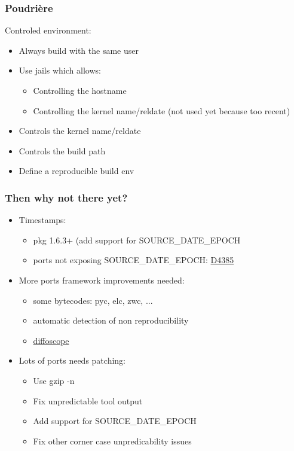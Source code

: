 \begin{frame}
	\frametitle{Poudrière}
	Controled environment:
	\begin{itemize}
		\item Always build with the same user
		\item Use jails which allows:
			\begin{itemize}
				\item Controlling the hostname
				\item Controlling the kernel name/reldate (not used yet because too recent)
			\end{itemize}
		\item Controls the kernel name/reldate
		\item Controls the build path
		\item Define a reproducible build env
	\end{itemize}
\end{frame}

\begin{frame}
	\frametitle{Then why not there yet?}
	\begin{itemize}
		\pause
		\item Timestamps:
			\begin{itemize}
				\item pkg 1.6.3+ (add support for SOURCE\_DATE\_EPOCH
				\item ports not exposing SOURCE\_DATE\_EPOCH: \href{https://reviews.freebsd.org/D4385}{D4385}
			\end{itemize}
		\pause
		\item More ports framework improvements needed:
			\begin{itemize}
				\item some bytecodes: pyc, elc, zwc, ...
				\item automatic detection of non reproducibility
				\item \href{https://diffoscope.org/}{diffoscope}
			\end{itemize}
		\pause
		\item Lots of ports needs patching:
			\begin{itemize}
				\item Use gzip -n
				\item Fix unpredictable tool output
				\item Add support for SOURCE\_DATE\_EPOCH
				\item Fix other corner case unpredicability issues
			\end{itemize}
	\end{itemize}
\end{frame}

